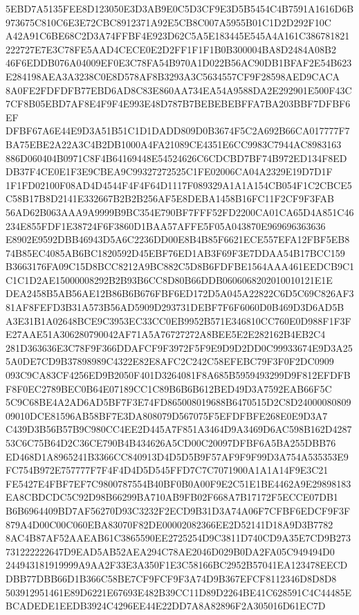 \documentclass[UTF8,fontset=fandol,zihao=-4,a4paper]{ctexart}
\begin{document}
{{5EBD7A5135FEE8D123050E3D3AB9E0C5D3CF9E3D5B5454C4B7591A1616D6B973675C810C6E3E72CBC8912371A92E5CB8C007A5955B01C1D2D292F10C
A42A91C6BE68C2D3A74FFBF4E923D62C5A5E183445E545A4A161C386781821222727E7E3C78FE5AAD4CECE0E2D2FF1F1F1B0B300004BA8D2484A08B2
46F6EDDB076A04009EF0E3C78FA54B970A1D022B56AC90DB1BFAF2E54B623E284198AEA3A3238C0E8D578AF8B3293A3C5634557CF9F28598AED9CACA
8A0FE2FDFDFB77EBD6AD8C83E860AA734EA54A9588DA2E292901E500F43C7CF8B05EBD7AF8E4F9F4E993E48D787B7BEBEBEBFFA7BA203BBF7DFBF6EF
DFBF67A6E44E9D3A51B51C1D1DADD809D0B3674F5C2A692B66CA017777F7BA75EBE2A22A3C4B2DB1000A4FA21089CE4351E6CC9983C7944AC8983163
886D060404B0971C8F4B64169448E54524626C6CDCBD7BF74B972ED134F8EDDB37F4CE0E1F3E9CBEA9C99327272525C1FE02006CA04A2329E19D7D1F
1F1FD02100F08AD4D4544F4F4F64D1117F089329A1A1A154CB054F1C2CBCE5C58B17B8D2141E332667B2B2B256AF5E8DEBA1458B16FC11F2CF9F3FAB
56AD62B063AAA9A9999B9BC354E790BF7FFF52FD2200CA01CA65D4A851C46234E855FDF1E38724F6F3860D1BAA57AFFE5F05A043870E969696363636
E8902E9592DBB46943D5A6C2236DD00E8B4B85F6621ECE557EFA12FBF5EB874B85EC4085AB6BC1820592D45EBF76ED1AB3F69F3E7DDAA54B17BCC159
B3663176FA09C15D8BCC8212A9BC882C5D8B6FDFBE1564AAA461EEDCB9C1C1C1D2AE15000008292B2B93B6CC8D80B66DDB0606068202010010121E1E
DEA2458B5AB56AE12B86B6B676FBF6ED172D5A045A22822C6D5C69C826AF381AF8FEFD3B31A573B56AD5909D293731DEBF7F6F6060D0B469D3D6AD5B
A3E31B1A02648BCE9C3953EC33CC0EB9952B571E346810CC760E0D988F1F3FE27AAE51A306280790042AF71A5A76727272A8BEE5E2E282162B4EB2C4
281D363636E3C78F9F366DDAFCF9F3972F5F9E9D9D2DD0C99933674E9D3A255A0DE7CD9B37898989C4322E82E8AFC2C242C58EFEBC79F3F0F2DC0909
093C9CA83CF4256ED9B2050F401D3264081F8A685B5959493299D9F812EFDFBF8F0EC2789BEC0B64E07189CC1C89B6B6B612BED49D3A7592EAB66F5C
5C9C68BE4A2AD6AD5BF7F3E74FD865008019688B6470515D2C8D2400008080909010DCE81596AB58BF7E3DA808079D567075F5EFDFBFE268E0E9D3A7
C439D3B56B57B9C980CC4EE2D445A7F851A3464D9A3469D6AC598B162D428753C6C75B64D2C36CE790B4B434626A5CD00C20097DFBF6A5BA255DBB76
ED468D1A8965241B3366CC840913D4D5D5B9F57AF9F9F99D3A754A535353E9FC754B972E757777F7F4F4D4D5D545FFD7C7C7071900A1A1A14F9E3C21
FE5427E4FBF7EF7C9800787554B40BF0B0A00F9E2C51E1BE4462A9E29898183EA8CBDCDC5C92D98B66299BA710AB9FB02F668A7B17172F5ECCE07DB1
B6B6964409BD7AF56270D93C3232F2ECD9B31D3A74A06F7CFBF6EDCF9F3F879A4D00C00C060EBA83070F82DE00002082366EE2D52141D18A9D3B7782
8AC4B87AF52AAEAB61C3865590EE2725254D9C3811D740CD9A35E7CD9B273731222222647D9EAD5AB52AEA294C78AE2046D029B0DA2FA05C949494D0
244943181919999A9AA2F33E3A350F1E3C58166BC2952B57041EA123478EECDDBB77DBB66D1B366C58BE7CF9FCF9F3A74D9B367EFCF8112346D8D8D8
503912951461E89D6221E67693E482B39CC11D89D2264BE41C628591C4C44485EBCADEDE1EEDB3924C4296EE44E22DD7A8A82896F2A305016D61EC7D
}}
\end{document}
